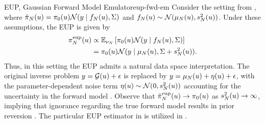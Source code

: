 \documentclass[12pt]{article}
\begin{document}
\begin{examplebox}{EUP, Gaussian Forward Model Emulator}{eup-fwd-em}
Consider the setting from , where
${\tilde{\pi}}_{N}(u) = \pi_0(u) \mathcal{N}(y \mid f_{N}(u), \Sigma)$
and $f_{N}(u) \sim \mathcal{N}(\mu_{N}(u), s^2_{N}(u))$.
Under these assumptions, the EUP is given by
\begin{align}
{\pi}_{N}^{\mathrm{eup}}(u)
&\propto \mathbb{E}_{\nu_{N}}\left[\pi_0(u)\mathcal{N}(y \mid f_{N}(u), \Sigma) \right] \nonumber \\
&= \pi_0(u) \mathcal{N}(y \mid \mu_{N}(u), \Sigma + s^2_{N}(u)). \label{eq:eup-gaussian}
\end{align}
Thus, in this setting the EUP admits a natural data space interpretation. 
The original inverse problem $y = \mathcal{G}(u) + \epsilon$ is replaced by
$y = \mu_{N}(u) + \eta(u) + \epsilon$, with the parameter-dependent
noise term $\eta(u) \sim \mathcal{N}(0, s^2_{N}(u))$ accounting for the 
uncertainty in the forward model \citep{CES,StuartTeck1}. Observe that
${\tilde{\pi}}_{N}^{\mathrm{eup}}(u) \to \pi_0(u)$ as $s^2_{N}(u) \to \infty$,
implying that ignorance regarding the true forward model results in 
prior reversion \citep{ourSurrPropPaper}. The particular EUP estimator in 
is utilized in \citet{Surer2023sequential,weightedIVAR,StuartTeck2,GP_PDE_priors,CES,
idealizedGCM,villani2024posteriorsamplingadaptivegaussian,hydrologicalModel,hydrologicalModel2}.
\end{examplebox}
\end{document}
